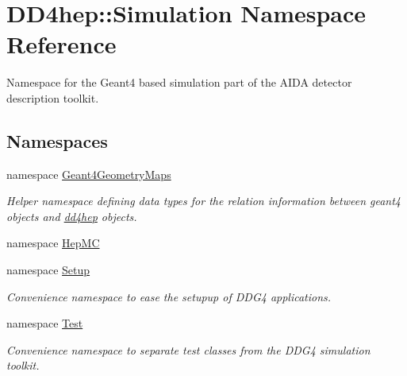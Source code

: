 \hypertarget{namespace_d_d4hep_1_1_simulation}{
\section{DD4hep::Simulation Namespace Reference}
\label{namespace_d_d4hep_1_1_simulation}
}


Namespace for the Geant4 based simulation part of the AIDA detector description toolkit.  
\subsection*{Namespaces}
\begin{DoxyCompactItemize}
\item 
namespace \hyperlink{namespace_d_d4hep_1_1_simulation_1_1_geant4_geometry_maps}{Geant4GeometryMaps}


\begin{DoxyCompactList}\small\item\em Helper namespace defining data types for the relation information between geant4 objects and \hyperlink{namespacedd4hep}{dd4hep} objects. \item\end{DoxyCompactList}\item 
namespace \hyperlink{namespace_d_d4hep_1_1_simulation_1_1_hep_m_c}{HepMC}
\item 
namespace \hyperlink{namespace_d_d4hep_1_1_simulation_1_1_setup}{Setup}


\begin{DoxyCompactList}\small\item\em Convenience namespace to ease the setupup of DDG4 applications. \item\end{DoxyCompactList}\item 
namespace \hyperlink{namespace_d_d4hep_1_1_simulation_1_1_test}{Test}


\begin{DoxyCompactList}\small\item\em Convenience namespace to separate test classes from the DDG4 simulation toolkit. \item\end{DoxyCompactList}\end{DoxyCompactItemize}
